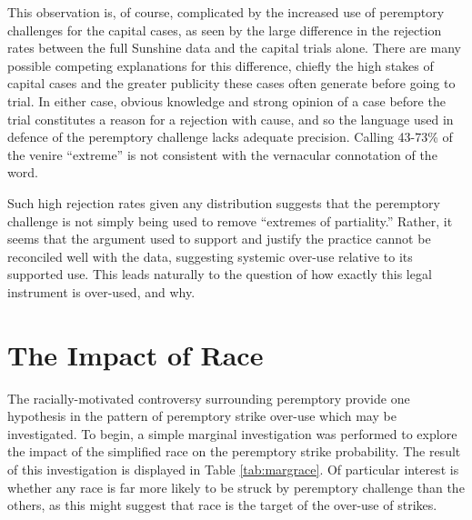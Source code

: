 This observation is, of course, complicated by the increased use of peremptory challenges for the capital cases, as seen by the
large difference in the rejection rates between the full Sunshine data and the capital trials alone. There are many possible
competing explanations for this difference, chiefly the high stakes of capital cases and the greater publicity these cases often
generate before going to trial. In either case, obvious knowledge and strong opinion of a case before the trial constitutes a
reason for a rejection with cause, and so the language used in defence of the peremptory challenge lacks adequate
precision. Calling 43-73\% of the venire ``extreme'' is not consistent with the vernacular connotation of the word.

Such high rejection rates given any distribution suggests that the peremptory challenge is not simply being used to remove
``extremes of partiality.'' Rather, it seems that the argument used to support and justify the practice cannot be reconciled well
with the data, suggesting systemic over-use relative to its supported use. This leads naturally to the question of how exactly
this legal instrument is over-used, and why.

\section{The Impact of Race} \label{sec:impactrace} 

The racially-motivated controversy surrounding peremptory provide one hypothesis in the pattern of peremptory strike over-use
which may be investigated. To begin, a simple marginal investigation was performed to explore the impact of the simplified race on
the peremptory strike probability. The result of this investigation is displayed in Table \ref{tab:margrace}. Of particular
interest is whether any race is far more likely to be struck by peremptory challenge than the others, as this might suggest that
race is the target of the over-use of strikes.

